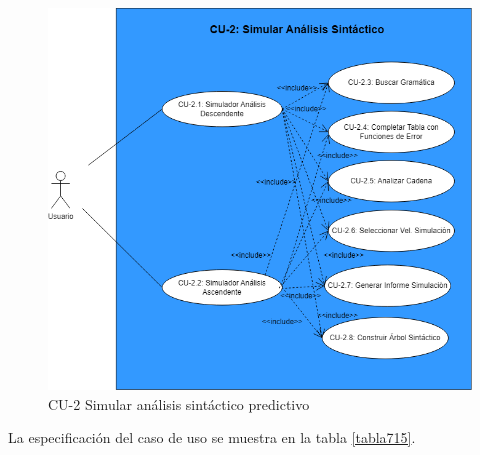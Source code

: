  \begin{figure}[H]
       \begin{center} 
 	\includegraphics[scale=0.55]{figuras/Cap7/CU2.png}
 	\caption{CU-2 Simular análisis sintáctico predictivo}
 	\label{fig:CU2}
       \end{center}
   \end{figure}
  
 La especificación del caso de uso se muestra en la tabla \ref{tabla715}.


